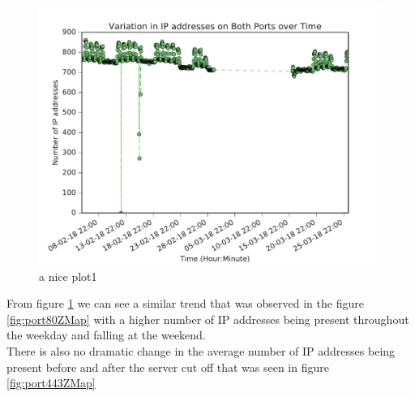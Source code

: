 \documentclass[a4wide,leqno,12pt]{report}
\begin{document}
\begin{figure}[h!]
\includegraphics[scale=.5]{pdf_images/VariationInIpAddressesOnBothPortsOverTime}
\caption{a nice plot1}
\label{fig:portsBothZMap}
\end{figure}
From figure \ref{fig:portsBothZMap} we can see a similar trend that was observed in the figure \ref{fig:port80ZMap} with a higher number of IP addresses being present throughout the weekday and falling at the weekend.\\

There is also no dramatic change in the average number of IP addresses being present before and after the server cut off that was seen in figure \ref{fig:port443ZMap}
\end{document}
